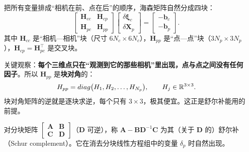 把所有变量排成``相机在前、点在后''的顺序，海森矩阵自然分成四块：
\begin{equation}
\begin{bmatrix}
\bm{H}_{cc}&\bm{H}_{cp}\\[2pt]
\bm{H}_{pc}&\bm{H}_{pp}
\end{bmatrix}
\begin{bmatrix}\delta\bm{\xi}_c\\[2pt]\delta\bm{X}_p\end{bmatrix}
=
\begin{bmatrix}-\bm{b}_c\\[2pt]-\bm{b}_p\end{bmatrix}.
\label{eq:13-ba-block}
\end{equation}
其中 $\bm{H}_{cc}$ 是``相机—相机''块（尺寸 $6N_c\times6N_c$），$\bm{H}_{pp}$ 是``点—点''块（$3N_p\times3N_p$），$\bm{H}_{cp}=\bm{H}_{pc}^{\top}$ 是交叉块。

关键观察：\textbf{每个三维点只在``观测到它的那些相机''里出现，点与点之间没有任何因子}。所以 $\bm{H}_{pp}$ 是\textbf{块对角}的：
\begin{equation}
H_{pp}=diag\big(H_{1},H_{2},\dots,H_{N_p}\big),
\qquad H_{j}\in\mathbb{R}^{3\times3}.
\end{equation}
块对角矩阵的逆就是逐块求逆，每个只有 $3\times3$，极其便宜。这正是舒尔补能用的前提。

\begin{definition}[舒尔补]
对分块矩阵 $\begin{bmatrix}\bm{A}&\bm{B}\\\bm{C}&\bm{D}\end{bmatrix}$（$\bm{D}$ 可逆），称 $\bm{A}-\bm{B}\bm{D}^{-1}\bm{C}$ 为其（关于 $\bm{D}$ 的）舒尔补（Schur complement）。它在消去分块线性方程组中的变量 $\delta_p$ 时自然出现。
\end{definition}


